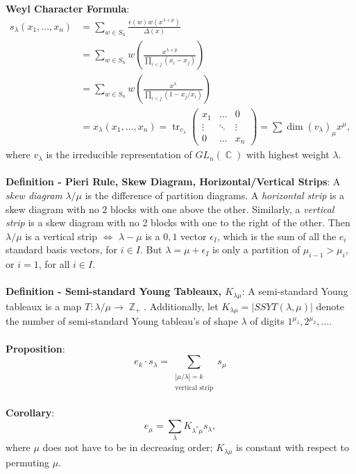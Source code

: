\documentclass{article}
\DeclareMathOperator{\Z}{\mathbb{Z}}
\DeclareMathOperator{\C}{\mathbb{C}}
\DeclareMathOperator{\trace}{tr}
\begin{document}
\textbf{Weyl Character Formula}: \begin{align*}
    s_\lambda(x_1, \dots, x_n) &= \sum_{w \in S_n} \frac{\epsilon(w) w(x^{\lambda + p})}{\Delta(x)} \\
    &= \sum_{w \in S_n} w \left( \frac{x^{\lambda + p}}{\prod_{i < j} (x_i - x_j)} \right) \\
    &= \sum_{w \in S_n} w \left( \frac{x^\lambda}{\prod_{i < j} (1 - x_j/x_i)} \right) \\
    &= x_\lambda (x_1, \dots, x_n) = \trace_{v_\lambda} \begin{pmatrix}
        x_1 & \dots & 0 \\
        \vdots & \ddots & \vdots \\
        0 & \dots & x_n
    \end{pmatrix} = \sum \dim(v_\lambda)_\mu x^\mu,
\end{align*} where $v_\lambda$ is the irreducible representation of $GL_n(\C)$ with highest weight $\lambda$. \\ \\
\textbf{Definition - Pieri Rule, Skew Diagram, Horizontal/Vertical Strips}: A \textit{skew diagram} $\lambda / \mu$ is the difference of partition diagrams. A \textit{horizontal strip} is a skew diagram with no 2 blocks with one above the other. Similarly, a \textit{vertical strip} is a skew diagram with no 2 blocks with one to the right of the other. Then $\lambda / \mu$ is a vertical strip $\iff$ $\lambda - \mu$ is a $0, 1$ vector $\epsilon_I$, which is the sum of all the $e_i$ standard basis vectors, for $i \in I$. But $\lambda = \mu + \epsilon_I$ is only a partition of $\mu_{i - 1} > \mu_i$, or $i = 1$, for all $i \in I$. \\ \\
\textbf{Definition - Semi-standard Young Tableaux, $K_{\lambda \mu}$}: A semi-standard Young tableaux is a map $T: \lambda / \mu \rightarrow \Z_+$. Additionally, let $K_{\lambda \mu} = |SSYT(\lambda, \mu)|$ denote the number of semi-standard Young tableau's of shape $\lambda$ of digits $1^{\mu_1}, 2^{\mu_2}, \dots$. \\ \\
\textbf{Proposition}: $$e_k \cdot s_\lambda = \sum_{\substack{{|\mu / \lambda| = k} \\ {\text{vertical strip}}}} s_\mu$$ \\
\textbf{Corollary}: $$e_\mu = \sum_\lambda K_{\lambda^* \mu} s_\lambda,$$ where $\mu$ does not have to be in decreasing order; $K_{\lambda \mu}$ is constant with respect to permuting $\mu$. \\ \\
\end{document}

